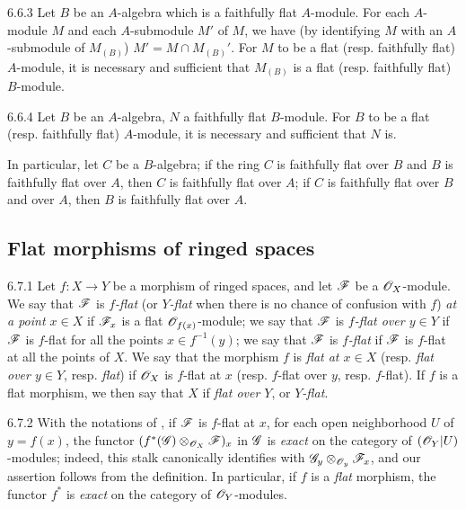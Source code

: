 \begin{env}{6.6.3}
\label{env-0.6.6.3}
Let $B$ be an $A$-algebra which is a faithfully flat $A$-module. For each $A$-module $M$ and
each $A$-submodule $M'$ of $M$, we have (by identifying $M$ with an $A$-submodule of
$M_{(B)}$) $M'=M\cap M_{(B)}'$. For $M$ to be a flat (resp. faithfully flat) $A$-module, it
is necessary and sufficient that $M_{(B)}$ is a flat (resp. faithfully flat) $B$-module.
\end{env}

\begin{env}{6.6.4}
\label{env-0.6.6.4}
Let $B$ be an $A$-algebra, $N$ a faithfully flat $B$-module. For $B$ to be a flat
(resp. faithfully flat) $A$-module, it is necessary and sufficient that $N$ is.

In particular, let $C$ be a $B$-algebra; if the ring $C$ is faithfully flat over $B$ and $B$
is faithfully flat over $A$, then $C$ is faithfully flat over $A$; if $C$ is faithfully flat
over $B$ and over $A$, then $B$ is faithfully flat over $A$.
\end{env}

\subsection{Flat morphisms of ringed spaces}
\label{0-prelim-6.7}

\begin{env}{6.7.1}
\label{env-0.6.7.1}
Let $f:X\to Y$ be a morphism of ringed spaces, and let $\mathscr{F}$ be a $\mathscr{O}_X$-module. We say
that $\mathscr{F}$ is \emph{$f$-flat} (or \emph{$Y$-flat} when there is no chance of confusion
with $f$) \emph{at a point $x\in X$} if $\mathscr{F}_x$ is a flat $\mathscr{O}_{f(x)}$-module; we say that
$\mathscr{F}$ is \emph{$f$-flat over $y\in Y$} if $\mathscr{F}$ is $f$-flat for all the points
$x\in f^{-1}(y)$; we say that $\mathscr{F}$ is \emph{$f$-flat} if $\mathscr{F}$ is $f$-flat at all the
points of $X$. We say that the morphism $f$ is \emph{flat at $x\in X$} (resp. \emph{flat over
$y\in Y$}, resp. \emph{flat}) if $\mathscr{O}_X$ is $f$-flat at $x$ (resp. $f$-flat over $y$, resp.
$f$-flat). If $f$ is a flat morphism, we then say that $X$ if \emph{flat over $Y$}, or
\emph{$Y$-flat}.
\end{env}

\begin{env}{6.7.2}
\label{env-0.6.7.2}
With the notations of , if $\mathscr{F}$ is $f$-flat at $x$, for each open
neighborhood $U$ of $y=f(x)$, the functor $(f^*(\mathscr{G})\otimes_{\mathscr{O}_X}\mathscr{F})_x$ in $\mathscr{G}$
is \emph{exact} on the category of $(\mathscr{O}_Y|U)$-modules; indeed, this stalk canonically
identifies with $\mathscr{G}_y\otimes_{\mathscr{O}_y}\mathscr{F}_x$, and our assertion follows from the
definition. In particular, if $f$ is a \emph{flat} morphism, the functor $f^*$ is
\emph{exact} on the category of $\mathscr{O}_Y$-modules.
\end{env}

